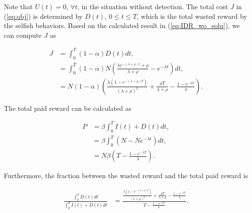 Note that $U(t)=0$, $\forall t$,
in the situation without detection.
The total cost $J$ in (\ref{eq:obj}) is determined by $D(t)$, $0 \le t \le T$,
which is the total wasted reward by the selfish behaviors.
Based on the calculated result in (\ref{eq:IDR_wo_solu}),
we can compute $J$ as
\begin{small}
\begin{equation}
\nonumber
\begin{aligned}
J &= \int_{0}^{T} (1-\alpha) D(t) dt, \\
&= \int_{0}^{T} (1-\alpha) N (\frac{\lambda e^{-(\lambda + \rho)t} + \rho}{ \lambda + \rho } - e^{- \lambda t}) dt, \\
&= N (1-\alpha) \left( \frac{\lambda (1-e^{-(\lambda+\rho)T})}{ (\lambda + \rho)^{2} }
+ \frac{\rho T}{\lambda + \rho}
- \frac{1-e^{-\lambda T}}{\lambda} \right).
\end{aligned}
\end{equation}
\end{small}
The total paid reward can be calculated as
\begin{small}
\begin{equation}
\nonumber
\begin{aligned}
P &= \beta \int_{0}^{T} I(t) + D(t) dt, \\
&= \beta \int_{0}^{T} (N - N e^{- \lambda t}) dt, \\
&= N \beta (T - \frac{ 1 - e^{-\lambda T} }{\lambda} ).
\end{aligned}
\end{equation}
\end{small}
Furthermore, the fraction between the wasted reward and the total paid reward is
\begin{small}
\begin{equation}
\nonumber
\begin{aligned}
\frac{\int_{0}^{T} D(t) dt}{\int_{0}^{T} I(t) + D(t) dt}
&= \frac{ \frac{\lambda (1-e^{-(\lambda+\rho)T})}{ (\lambda + \rho)^{2} }
+ \frac{\rho T}{\lambda + \rho}
- \frac{1-e^{-\lambda T}}{\lambda} }
{T - \frac{ 1 - e^{-\lambda T} }{\lambda} }.
\end{aligned}
\end{equation}
\end{small}

